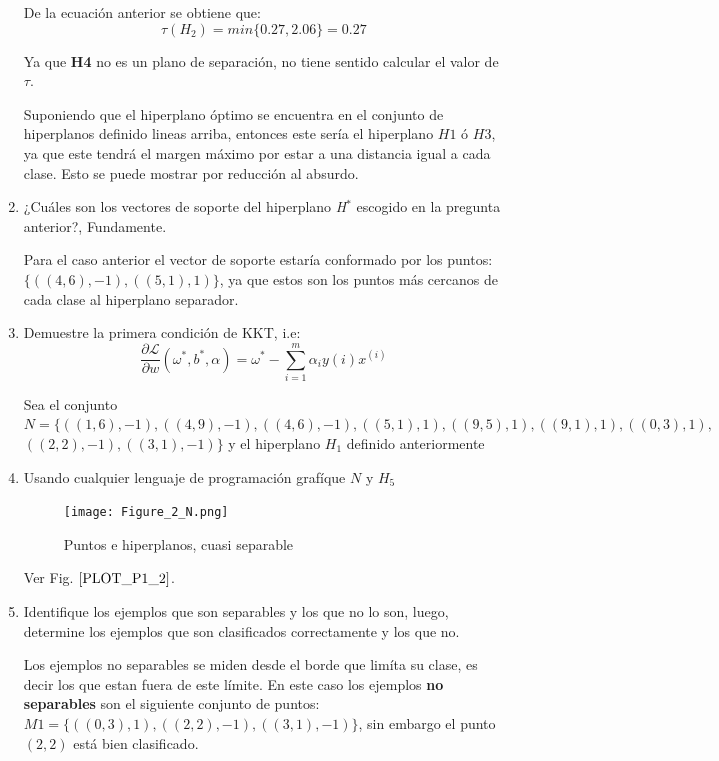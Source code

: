 \documentclass{article}
\begin{document}
\begin{enumerate}
    De la ecuación anterior se obtiene que:
    \[
        \tau(H_2) = min\{0.27, 2.06\} = 0.27    
    \]

    Ya que \textbf{H4} no es un plano de separación, no tiene sentido calcular el valor de $\tau$.

    Suponiendo que el hiperplano óptimo se encuentra en el conjunto de hiperplanos definido lineas arriba, entonces este sería
    el hiperplano $H1$ ó $H3$, ya que este tendrá el margen máximo por estar a una distancia igual a cada clase. Esto se puede mostrar
    por reducción al absurdo.

    \item ¿Cuáles son los vectores de soporte del hiperplano \textit{H}$^*$ escogido en la pregunta anterior?, Fundamente.

    Para el caso anterior el vector de soporte estaría conformado por los puntos: $\{((4, 6), -1), ((5, 1), 1)\}$, ya que estos son
    los puntos más cercanos de cada clase al hiperplano separador.

    \item Demuestre la primera condición de \textnormal{KKT}, i.e: 
    \[
        \frac{\partial \mathcal{L}}{\partial w} (\omega^*, b^*, \alpha)= \omega^* - \sum_{i=1}^m \alpha_i y(i)x^{(i)}    
    \]
    
Sea el conjunto $N = \{((1, 6), -1), ((4, 9), -1),((4, 6), -1), ((5, 1), 1), ((9,5), 1), ((9,1), 1), ((0, 3), 1),$ \newline
$((2,2),-1), ((3,1),-1)\}$ y el
hiperplano $H_1$ definido anteriormente

    \item Usando cualquier lenguaje de programación grafíque $N$ y $H_5$

    \begin{figure}[h]
        \label{PLOT_P1_2}
        \centering
        \texttt{[image: Figure\_2\_N.png]}
        \caption{Puntos e hiperplanos, cuasi separable}
    \end{figure}
    Ver Fig. $\ref{PLOT_P1_2}$. 

    \item Identifique los ejemplos que son separables y los que no lo son, luego, determine los ejemplos que son clasificados correctamente y los que no.

    Los ejemplos no separables se miden desde el borde que limíta su clase, es decir los que estan fuera de este límite. En este caso
    los ejemplos \textbf{no separables} son el siguiente conjunto de puntos: $M1 = \{((0, 3), 1), ((2,2),-1), ((3,1),-1) \}$, sin embargo el punto $(2,2)$ está
    bien clasificado.


\end{enumerate}
\end{document}
